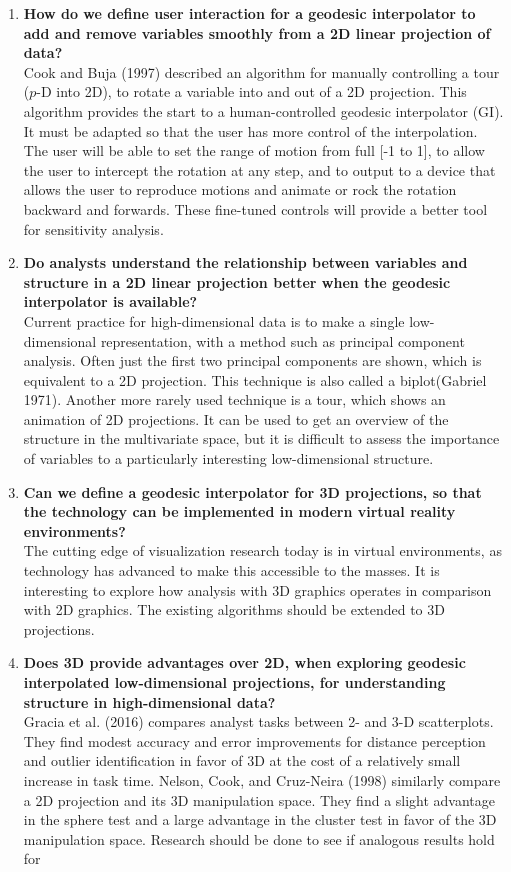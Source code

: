 \documentclass[
  11,
]{article}
\begin{document}
\begin{enumerate}
\def\labelenumi{\arabic{enumi}.}
\item
  \textbf{How do we define user interaction for a geodesic interpolator to add and remove variables smoothly from a 2D linear projection of data?}\\
  Cook and Buja (1997) described an algorithm for manually controlling a tour (\(p\)-D into 2D), to rotate a variable into and out of a 2D projection. This algorithm provides the start to a human-controlled geodesic interpolator (GI). It must be adapted so that the user has more control of the interpolation. The user will be able to set the range of motion from full {[}-1 to 1{]}, to allow the user to intercept the rotation at any step, and to output to a device that allows the user to reproduce motions and animate or rock the rotation backward and forwards. These fine-tuned controls will provide a better tool for sensitivity analysis.
\item
  \textbf{Do analysts understand the relationship between variables and structure in a 2D linear projection better when the geodesic interpolator is available?}\\
  Current practice for high-dimensional data is to make a single low-dimensional representation, with a method such as principal component analysis. Often just the first two principal components are shown, which is equivalent to a 2D projection. This technique is also called a biplot(Gabriel 1971). Another more rarely used technique is a tour, which shows an animation of 2D projections. It can be used to get an overview of the structure in the multivariate space, but it is difficult to assess the importance of variables to a particularly interesting low-dimensional structure.
\item
  \textbf{Can we define a geodesic interpolator for 3D projections, so that the technology can be implemented in modern virtual reality environments?}\\
  The cutting edge of visualization research today is in virtual environments, as technology has advanced to make this accessible to the masses. It is interesting to explore how analysis with 3D graphics operates in comparison with 2D graphics. The existing algorithms should be extended to 3D projections.
\item
  \textbf{Does 3D provide advantages over 2D, when exploring geodesic interpolated low-dimensional projections, for understanding structure in high-dimensional data?}\\
  Gracia et al. (2016) compares analyst tasks between 2- and 3-D scatterplots. They find modest accuracy and error improvements for distance perception and outlier identification in favor of 3D at the cost of a relatively small increase in task time. Nelson, Cook, and Cruz-Neira (1998) similarly compare a 2D projection and its 3D manipulation space. They find a slight advantage in the sphere test and a large advantage in the cluster test in favor of the 3D manipulation space. Research should be done to see if analogous results hold for
\end{enumerate}
\end{document}
